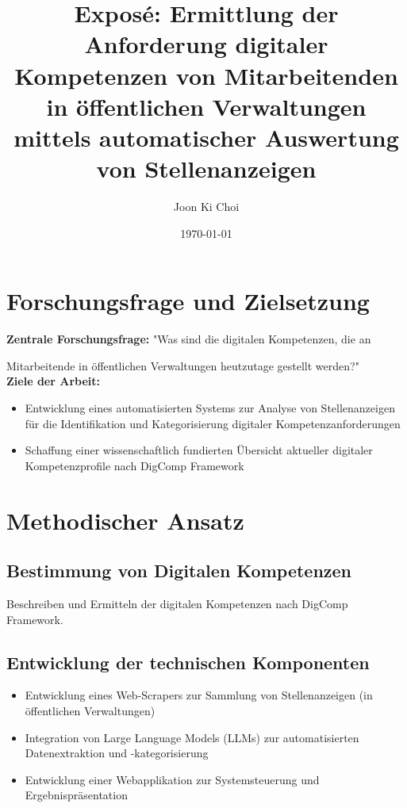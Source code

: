 \documentclass{article}
\title{Exposé: Ermittlung der Anforderung digitaler Kompetenzen von Mitarbeitenden in öffentlichen Verwaltungen mittels automatischer Auswertung von Stellenanzeigen}
\author{Joon Ki Choi}
\date{\today}
\begin{document}
\maketitle

\section{Forschungsfrage und Zielsetzung}

\hspace{11pt} \textbf{Zentrale Forschungsfrage:} "Was sind die digitalen Kompetenzen, die an

\setlength{\parindent}{15pt}Mitarbeitende in öffentlichen Verwaltungen heutzutage gestellt werden?"\\

\textbf{Ziele der Arbeit:}

\begin{itemize}
	\item Entwicklung eines automatisierten Systems zur Analyse von Stellenanzeigen für die Identifikation und Kategorisierung digitaler Kompetenzanforderungen
	\item Schaffung einer wissenschaftlich fundierten Übersicht aktueller digitaler Kompetenzprofile nach DigComp Framework
\end{itemize}

\section{Methodischer Ansatz}

\subsection{Bestimmung von Digitalen Kompetenzen}
Beschreiben und Ermitteln der digitalen Kompetenzen nach DigComp Framework.

\subsection{Entwicklung der technischen Komponenten}
\begin{itemize}
	\item Entwicklung eines Web-Scrapers zur Sammlung von Stellenanzeigen (in öffentlichen Verwaltungen)
	\item Integration von Large Language Models (LLMs) zur automatisierten Datenextraktion und -kategorisierung
	\item Entwicklung einer Webapplikation zur Systemsteuerung und Ergebnispräsentation
\end{itemize}
\end{document}
